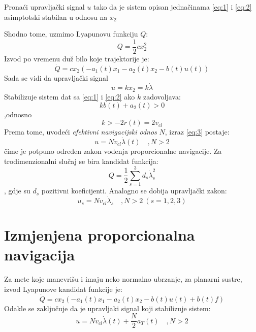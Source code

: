 \begin{tcolorbox}
    Pronaći upravljački signal $u$ tako da je sistem opisan jednačinama \ref{eq:1} i \ref{eq:2} asimptotski stabilan u odnosu na $x_2$
\end{tcolorbox}
Shodno tome, uzmimo Lyapunovu funkciju $Q$:
\begin{equation}
    Q=\frac{1}{2}cx_2^2
\end{equation}
Izvod po vremenu duž bilo koje trajektorije je:
\begin{equation}
    \dot{Q}=cx_2(-a_1(t)x_1-a_2(t)x_2-b(t)u(t))
\end{equation}
Sada se vidi da upravljački signal 
\begin{equation}
    u=kx_2=k\dot{\lambda}
    \label{eq:3}
\end{equation}
Stabilizuje sistem dat sa \ref{eq:1} i \ref{eq:2} ako $k$ zadovoljava:
\begin{equation}
    kb(t)+a_2(t)>0
\end{equation}
,odnosno \begin{equation}
    k>-2\dot{r}(t)=2v_{cl}
\end{equation}
Prema tome, uvodeći \textit{efektivni navigacijski odnos} $N$, izraz \ref{eq:3} postaje:
\begin{equation}
    u=Nv_{cl}\dot{\lambda}(t) \quad ,N>2
\end{equation}
čime je potpuno određen zakon vođenja proporcionalne navigacije.
Za trodimenzionalni slučaj se bira kandidat funkcija:
\begin{equation}
    Q=\frac{1}{2}\sum_{s=1}^3d_s\dot{\lambda}_s^2
\end{equation}
, gdje su $d_s$ pozitivni koeficijenti. Analogno se dobija upravljački zakon:
\begin{equation}
    u_s=Nv_{cl}\dot{\lambda}_s \quad ,N>2\ (s=1,2,3)
\end{equation}
\section{Izmjenjena proporcionalna navigacija}
Za mete koje manevrišu i imaju neko normalno ubrzanje, za planarni sustre, izvod Lyapunove kandidat 
funkcije je:
\begin{equation}
    \dot{Q}=cx_2(-a_1(t)x_1-a_2(t)x_2-b(t)u(t)+b(t)f)
\end{equation}
Odakle se zaključuje da je upravljaki signal koji stabilizuje sistem:
\begin{equation}
    u=Nv_{cl}\dot{\lambda}(t)+\frac{N}{2}a_T(t) \quad ,N>2
\end{equation}
